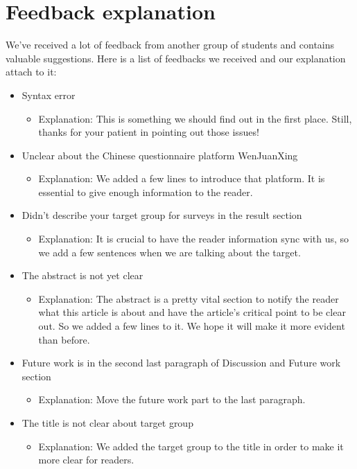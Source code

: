 \newpage
\section{Feedback explanation}
We've received a lot of feedback from another group of students and contains valuable suggestions. Here is a list of feedbacks we received and our explanation attach to it:
\begin{itemize}
    \item Syntax error
    \begin{itemize}
        \item Explanation: This is something we should find out in the first place. Still, thanks for your patient in pointing out those issues!
    \end{itemize}
    \item Unclear about the Chinese questionnaire platform WenJuanXing
    \begin{itemize}
        \item Explanation: We added a few lines to introduce that platform. It is essential to give enough information to the reader.
    \end{itemize}
    \item Didn’t describe your target group for surveys in the result section
    \begin{itemize}
        \item Explanation: It is crucial to have the reader information sync with us, so we add a few sentences when we are talking about the target.
    \end{itemize}
    \item The abstract is not yet clear
    \begin{itemize}
        \item Explanation: The abstract is a pretty vital section to notify the reader what this article is about and have the article's critical point to be clear out. So we added a few lines to it. We hope it will make it more evident than before.
    \end{itemize}
    \item Future work is in the second last paragraph of Discussion and Future work section
    \begin{itemize}
        \item Explanation: Move the future work part to the last paragraph.
    \end{itemize}
    \item The title is not clear about target group
        \begin{itemize}
        \item Explanation: We added the target group to the title in order to make it more clear for readers.
    \end{itemize}
    
\end{itemize}
    
